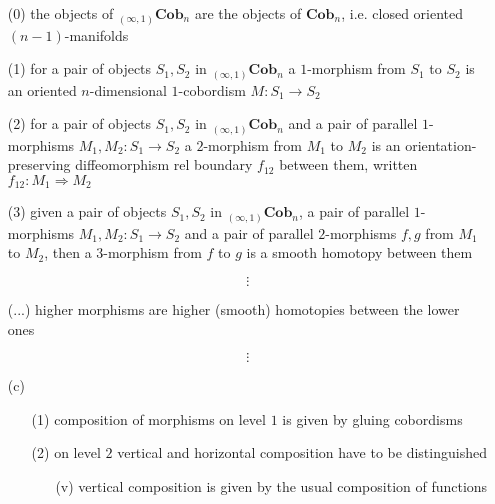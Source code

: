 \begin{enumerate}
\item[(0)]
the objects of ${_{(\infty,1)}}\mathbf{Cob}_{n}$ are the objects of $\mathbf{Cob}_{n}$, i.e. closed oriented $(n-1)$-manifolds

\item[(1)]
for a pair of objects $S_{1},S_{2}$ in ${_{(\infty,1)}}\mathbf{Cob}_{n}$ a $1$-morphism from $S_{1}$ to $S_{2}$ is an oriented $n$-dimensional $1$-cobordism $M \colon S_{1} \to S_{2}$

\item[(2)]
for a pair of objects $S_{1},S_{2}$ in ${_{(\infty,1)}}\mathbf{Cob}_{n}$ and a pair of parallel $1$-morphisms $M_{1},M_{2} \colon S_{1} \to S_{2}$ a $2$-morphism from $M_{1}$ to $M_{2}$ is an orientation-preserving diffeomorphism rel boundary $f_{12}$ between them, written $f_{12} \colon M_{1} \Rightarrow M_{2}$

\item[(3)]
given a pair of objects $S_{1},S_{2}$ in ${_{(\infty,1)}}\mathbf{Cob}_{n}$, a pair of parallel $1$-morphisms $M_{1},M_{2} \colon S_{1} \to S_{2}$ and a pair of parallel $2$-morphisms $f,g$ from $M_{1}$ to $M_{2}$, then a $3$-morphism from $f$ to $g$ is a smooth homotopy between them

\item[]
\begin{equation*}
\vdots
\end{equation*}
\item[]

\item[(...)]
higher morphisms are higher (smooth) homotopies between the lower ones

\item[]
\begin{equation*}
\vdots
\end{equation*}
\item[]

\item[(c)]
\begin{enumerate}
\item[(1)]
composition of morphisms on level $1$ is given by gluing cobordisms

\item[(2)]
on level $2$ vertical and horizontal composition have to be distinguished
\begin{enumerate}
\item[(v)]
vertical composition is given by the usual composition of functions


\end{enumerate}
\end{enumerate}
\end{enumerate}
